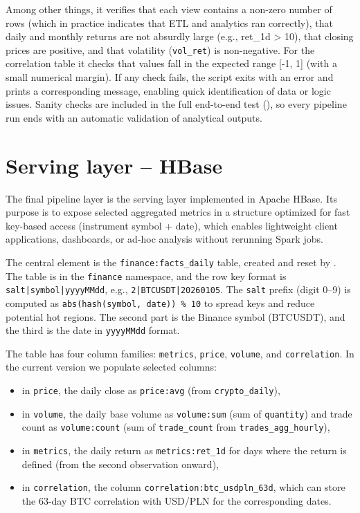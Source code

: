 \documentclass{article}
\begin{document}
Among other things, it verifies that each view contains a non-zero number
of rows (which in practice indicates that ETL and analytics ran
correctly), that daily and monthly returns are not absurdly large (e.g.,
\textbar ret\_1d\textbar{} \textgreater{} 10), that closing prices are
positive, and that volatility (\texttt{vol\_ret}) is non-negative. For the
correlation table it checks that values fall in the expected range
{[}-1, 1{]} (with a small numerical margin). If any check fails, the
script exits with an error and prints a corresponding message, enabling
quick identification of data or logic issues. Sanity checks are included
in the full end-to-end test
(), so every pipeline run ends
with an automatic validation of analytical outputs.

\section{Serving layer -- HBase}

The final pipeline layer is the serving layer implemented in Apache
HBase. Its purpose is to expose selected aggregated metrics in a
structure optimized for fast key-based access (instrument symbol + date),
which enables lightweight client applications, dashboards, or ad-hoc
analysis without rerunning Spark jobs.

The central element is the \texttt{finance:facts\_daily} table, created
and reset by . The table is in the
\texttt{finance} namespace, and the row key format is
\texttt{salt|symbol|yyyyMMdd}, e.g., \texttt{2|BTCUSDT|20260105}. The
\texttt{salt} prefix (digit 0--9) is computed as
\texttt{abs(hash(symbol,\ date))\ \%\ 10} to spread keys and reduce
potential hot regions. The second part is the Binance symbol (BTCUSDT),
and the third is the date in \texttt{yyyyMMdd} format.

The table has four column families: \texttt{metrics}, \texttt{price},
\texttt{volume}, and \texttt{correlation}. In the current version we
populate selected columns:

\begin{itemize}
\item
  in \texttt{price}, the daily close as \texttt{price:avg} (from
  \texttt{crypto\_daily}),
\item
  in \texttt{volume}, the daily base volume as \texttt{volume:sum} (sum of
  \texttt{quantity}) and trade count as \texttt{volume:count} (sum of
  \texttt{trade\_count} from \texttt{trades\_agg\_hourly}),
\item
  in \texttt{metrics}, the daily return as \texttt{metrics:ret\_1d} for
  days where the return is defined (from the second observation onward),
\item
  in \texttt{correlation}, the column
  \texttt{correlation:btc\_usdpln\_63d}, which can store the 63-day BTC
  correlation with USD/PLN for the corresponding dates.
\end{itemize}
\end{document}
